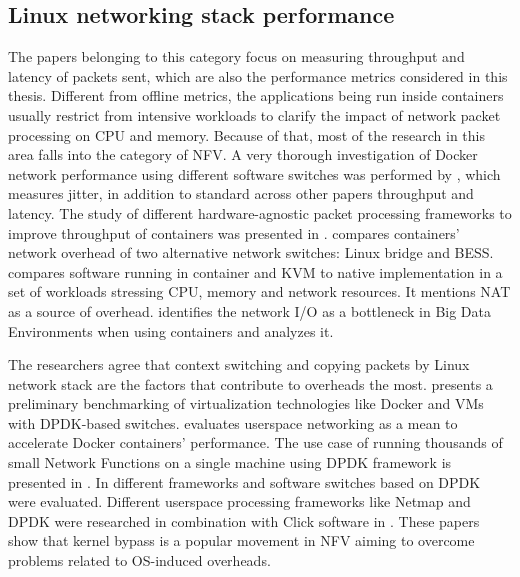 \documentclass[english]{kththesis}
\begin{document}
\subsection{Linux networking stack performance}
The papers belonging to this category focus on measuring throughput and latency of packets sent, which are also the performance metrics considered in this thesis. Different from offline metrics, the applications being run inside containers usually restrict from intensive workloads to clarify the impact of network packet processing on CPU and memory. Because of that, most of the research in this area falls into the category of \gls{NFV}. A very thorough investigation of Docker network performance using different software switches was performed by \cite{anderson_2016}, which measures jitter, in addition to standard across other papers throughput and latency. The study of different hardware-agnostic packet processing frameworks to improve throughput of containers was presented in \cite{thesis_2019}. \cite{hpc_nfv_2017} compares containers' network overhead of two alternative network switches: Linux bridge and BESS. \cite{vm_vs_container_2015} compares software running in container and KVM to native implementation in a set of workloads stressing CPU, memory and network resources. It mentions \gls{NAT} as a source of overhead. \cite{big_data_2016} identifies the network I/O as a bottleneck in Big Data Environments when using containers and analyzes it.

The researchers agree that context switching and copying packets by Linux network stack are the factors that contribute to overheads the most. \cite{virt_nfv_2015} presents a preliminary benchmarking of virtualization technologies like Docker and VMs with DPDK-based switches. \cite{thesis_2017} evaluates userspace networking as a mean to accelerate Docker containers' performance. The use case of running thousands of small Network Functions on a single machine using \gls{DPDK} framework is presented in \cite{dpdk_insight_2014}. In \cite{nvf_perf_2017} different frameworks and software switches based on DPDK were evaluated. Different userspace processing frameworks like Netmap and DPDK were researched in combination with Click software in \cite{barbette_2015}. These papers show that kernel bypass is a popular movement in \gls{NFV} aiming to overcome problems related to \gls{OS}-induced overheads.
\end{document}
